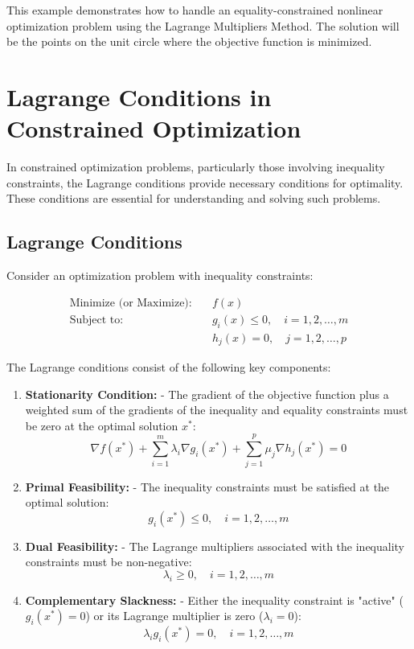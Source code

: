 \documentclass[a4paper]{article}
\begin{document}
This example demonstrates how to handle an equality-constrained nonlinear optimization problem using the Lagrange Multipliers Method. The solution will be the points on the unit circle where the objective function is minimized.

\section{Lagrange Conditions in Constrained Optimization}

In constrained optimization problems, particularly those involving inequality constraints, the Lagrange conditions provide necessary conditions for optimality. These conditions are essential for understanding and solving such problems.

\subsection{Lagrange Conditions}

Consider an optimization problem with inequality constraints:

\begin{align*}
\text{Minimize (or Maximize):} \quad & f(x) \\
\text{Subject to:} \quad & g_i(x) \leq 0, \quad i = 1, 2, \ldots, m \\
& h_j(x) = 0, \quad j = 1, 2, \ldots, p
\end{align*}


The Lagrange conditions consist of the following key components:

\begin{enumerate}
\item \textbf{Stationarity Condition:}
   - The gradient of the objective function plus a weighted sum of the gradients of the inequality and equality constraints must be zero at the optimal solution \(x^*\):
   \[
   \nabla f(x^*) + \sum_{i=1}^m \lambda_i \nabla g_i(x^*) + \sum_{j=1}^p \mu_j \nabla h_j(x^*) = 0
   \]

\item \textbf{Primal Feasibility:}
   - The inequality constraints must be satisfied at the optimal solution:
   \[
   g_i(x^*) \leq 0, \quad i = 1, 2, \ldots, m
   \]

\item \textbf{Dual Feasibility:}
   - The Lagrange multipliers associated with the inequality constraints must be non-negative:
   \[
   \lambda_i \geq 0, \quad i = 1, 2, \ldots, m
   \]

\item \textbf{Complementary Slackness:}
   - Either the inequality constraint is "active" (\(g_i(x^*) = 0\)) or its Lagrange multiplier is zero (\(\lambda_i = 0\)):
   \[
   \lambda_i g_i(x^*) = 0, \quad i = 1, 2, \ldots, m
   \]
\end{enumerate}
\end{document}
